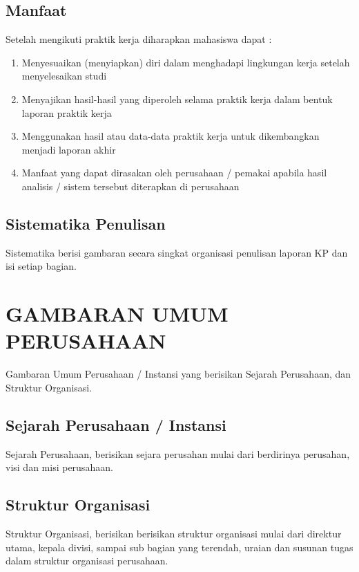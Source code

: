 \documentclass[oneside,listof=totoc]{scrbook}
\begin{document}
\section{Manfaat}
Setelah mengikuti praktik kerja diharapkan mahasiswa dapat :
\begin{enumerate}[label=\alph*.]
  \item Menyesuaikan (menyiapkan) diri dalam menghadapi lingkungan kerja setelah menyelesaikan studi
  \item Menyajikan hasil-hasil yang diperoleh selama praktik kerja dalam bentuk laporan praktik kerja
  \item Menggunakan hasil atau data-data praktik kerja untuk dikembangkan menjadi laporan akhir
  \item Manfaat yang dapat dirasakan oleh perusahaan / pemakai apabila hasil analisis / sistem tersebut diterapkan di perusahaan
\end{enumerate}

\section{Sistematika Penulisan}
Sistematika berisi gambaran secara singkat organisasi penulisan laporan KP dan isi setiap bagian.

\chapter{GAMBARAN UMUM PERUSAHAAN}

\vspace{0.5cm}

Gambaran Umum Perusahaan / Instansi yang berisikan Sejarah Perusahaan, dan Struktur Organisasi.

\section{Sejarah Perusahaan / Instansi}
Sejarah Perusahaan, berisikan sejara perusahan mulai dari berdirinya perusahan, visi dan misi perusahaan.

\section{Struktur Organisasi}
Struktur Organisasi, berisikan berisikan struktur organisasi mulai dari direktur utama, kepala divisi, sampai sub bagian yang terendah, uraian dan susunan tugas dalam struktur organisasi perusahaan.

\vspace{0.5cm}
\end{document}
